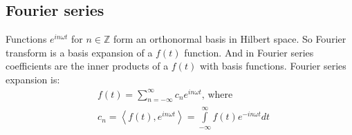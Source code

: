 \documentclass{article}
\begin{document}
\subsection{Fourier series}
Functions $e^{i n \omega t}$ for $n \in \mathbb{Z}$ form an orthonormal basis in Hilbert space.
So Fourier transform is a basis expansion of a $f(t)$ function.
And in Fourier series coefficients are the inner products of a $f(t)$ with basis functions.
Fourier series expansion is:
\begin{align*}
    &f(t) = \sum \limits^{\infty}_{n=- \infty} c_n e^{i n \omega t}, \, \text{where} \\
    &c_n = \left< f(t), e^{i n \omega t} \right> = \int \limits^{\infty}_{-\infty} f(t) e^{-i n \omega t}dt
\end{align*}



\end{document}
